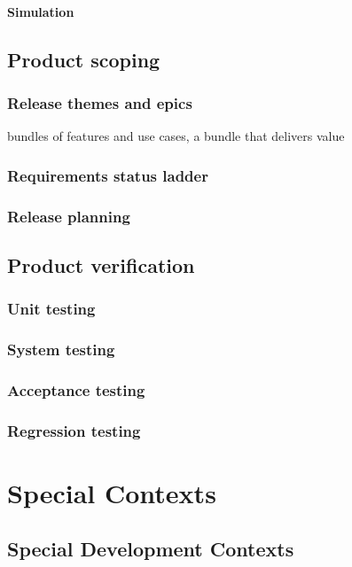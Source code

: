 \documentclass{reqengbook}
\begin{document}
\subsection{Simulation}


\chapter{Product scoping}

\section{Release themes and epics}

bundles of features and use cases, a bundle that delivers value

\section{Requirements status ladder}

\section{Release planning} 

\chapter{Product verification}
\section{Unit testing}
\section{System testing}
\section{Acceptance testing}
\section{Regression testing}

\part{Special Contexts}

\chapter{Special Development Contexts}
\end{document}
